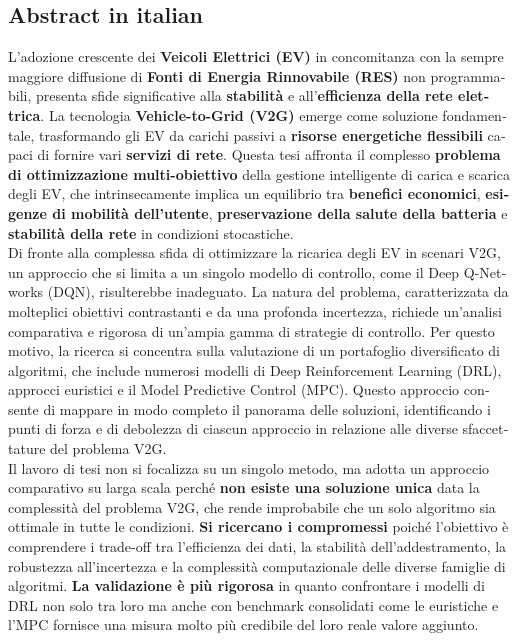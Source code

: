 \newpage
\begin{otherlanguage}{italian}
\section*{Abstract in italian}

L'adozione crescente dei \textbf{Veicoli Elettrici (EV)} in concomitanza con la sempre maggiore diffusione di \textbf{Fonti di Energia Rinnovabile (RES)} non programmabili, presenta sfide significative alla \textbf{stabilità} e all'\textbf{efficienza della rete elettrica}. La tecnologia \textbf{Vehicle-to-Grid (V2G)} emerge come soluzione fondamentale, trasformando gli EV da carichi passivi a \textbf{risorse energetiche flessibili} capaci di fornire vari \textbf{servizi di rete}. Questa tesi affronta il complesso \textbf{problema di ottimizzazione multi-obiettivo} della gestione intelligente di carica e scarica degli EV, che intrinsecamente implica un equilibrio tra \textbf{benefici economici}, \textbf{esigenze di mobilità dell'utente}, \textbf{preservazione della salute della batteria} e \textbf{stabilità della rete} in condizioni stocastiche.
\\
Di fronte alla complessa sfida di ottimizzare la ricarica degli EV in scenari V2G, un approccio che si limita a un singolo modello di controllo, come il Deep Q-Networks (DQN), risulterebbe inadeguato. La natura del problema, caratterizzata da molteplici obiettivi contrastanti  e da una profonda incertezza, richiede un'analisi comparativa e rigorosa di un'ampia gamma di strategie di controllo.
Per questo motivo, la ricerca si concentra sulla valutazione di un portafoglio diversificato di algoritmi, che include numerosi modelli di Deep Reinforcement Learning (DRL), approcci euristici e il Model Predictive Control (MPC). Questo approccio consente di mappare in modo completo il panorama delle soluzioni, identificando i punti di forza e di debolezza di ciascun approccio in relazione alle diverse sfaccettature del problema V2G.
\\
Il lavoro di tesi non si focalizza su un singolo metodo, ma adotta un approccio comparativo su larga scala perché \noindent\textbf{non esiste una soluzione unica} data la complessità del problema V2G, che rende improbabile che un solo algoritmo sia ottimale in tutte le condizioni. \textbf{Si ricercano i compromessi} poiché l'obiettivo è comprendere i trade-off tra l'efficienza dei dati, la stabilità dell'addestramento, la robustezza all'incertezza e la complessità computazionale delle diverse famiglie di algoritmi.
\noindent\textbf{La validazione è più rigorosa} in quanto confrontare i modelli di DRL non solo tra loro ma anche con benchmark consolidati come le euristiche e l'MPC fornisce una misura molto più credibile del loro reale valore aggiunto.

\end{otherlanguage}
\newpage
